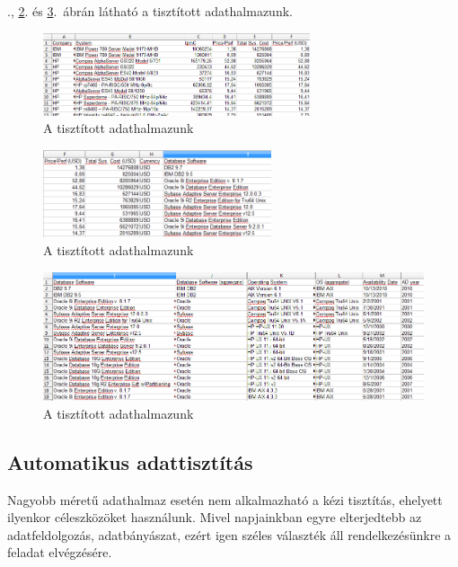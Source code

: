 \documentclass[a4paper,10pt,titlepage]{article}
\begin{document}
., \ref{fig:tpc_cleaned_002}. és \ref{fig:tpc_cleaned_003}.~ábrán látható a tisztított adathalmazunk.

\begin{figure}[h!]
\centering
\includegraphics[width=0.70\textwidth]{figures/tpc_cleaned_001.png}
\caption{A tisztított adathalmazunk \label{fig:tpc_cleaned_001}}
\end{figure}

\begin{figure}[h!]
\centering
\includegraphics[width=0.60\textwidth]{figures/tpc_cleaned_002.png}
\caption{A tisztított adathalmazunk \label{fig:tpc_cleaned_002}}
\end{figure}

\begin{figure}[h!]
\centering
\includegraphics[width=1.00\textwidth]{figures/tpc_cleaned_003.png}
\caption{A tisztított adathalmazunk \label{fig:tpc_cleaned_003}}
\end{figure}

\subsection{Automatikus adattisztítás}

Nagyobb méretű adathalmaz esetén nem alkalmazható a kézi tisztítás, ehelyett ilyenkor céleszközöket használunk. Mivel napjainkban egyre elterjedtebb az adatfeldolgozás, adatbányászat, ezért igen széles választék áll rendelkezésünkre a feladat elvégzésére.
\end{document}
